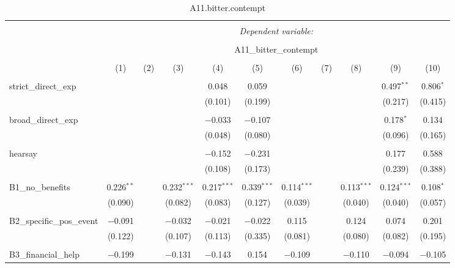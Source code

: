 
\begin{table}[H] \centering 
  \caption{A11.bitter.contempt} 
  \label{} 
\tiny 
\begin{tabular}{@{\extracolsep{4pt}}lcccccccccc} 
\\[-1.8ex]\hline 
\hline \\[-1.8ex] 
 & \multicolumn{10}{c}{\textit{Dependent variable:}} \\ 
\cline{2-11} 
\\[-1.8ex] & \multicolumn{10}{c}{A11\_bitter\_contempt} \\ 
\\[-1.8ex] & (1) & (2) & (3) & (4) & (5) & (6) & (7) & (8) & (9) & (10)\\ 
\hline \\[-1.8ex] 
 strict\_direct\_exp &  &  &  & 0.048 & 0.059 &  &  &  & 0.497$^{**}$ & 0.806$^{*}$ \\ 
  &  &  &  & (0.101) & (0.199) &  &  &  & (0.217) & (0.415) \\ 
  & & & & & & & & & & \\ 
 broad\_direct\_exp &  &  &  & $-$0.033 & $-$0.107 &  &  &  & 0.178$^{*}$ & 0.134 \\ 
  &  &  &  & (0.048) & (0.080) &  &  &  & (0.096) & (0.165) \\ 
  & & & & & & & & & & \\ 
 hearsay &  &  &  & $-$0.152 & $-$0.231 &  &  &  & 0.177 & 0.588 \\ 
  &  &  &  & (0.108) & (0.173) &  &  &  & (0.239) & (0.388) \\ 
  & & & & & & & & & & \\ 
 B1\_no\_benefits & 0.226$^{**}$ &  & 0.232$^{***}$ & 0.217$^{***}$ & 0.339$^{***}$ & 0.114$^{***}$ &  & 0.113$^{***}$ & 0.124$^{***}$ & 0.108$^{*}$ \\ 
  & (0.090) &  & (0.082) & (0.083) & (0.127) & (0.039) &  & (0.040) & (0.040) & (0.057) \\ 
  & & & & & & & & & & \\ 
 B2\_specific\_pos\_event & $-$0.091 &  & $-$0.032 & $-$0.021 & $-$0.022 & 0.115 &  & 0.124 & 0.074 & 0.201 \\ 
  & (0.122) &  & (0.107) & (0.113) & (0.335) & (0.081) &  & (0.080) & (0.082) & (0.195) \\ 
  & & & & & & & & & & \\ 
 B3\_financial\_help & $-$0.199 &  & $-$0.131 & $-$0.143 & 0.154 & $-$0.109 &  & $-$0.110 & $-$0.094 & $-$0.105 \\ 

\end{tabular}
\end{table}
